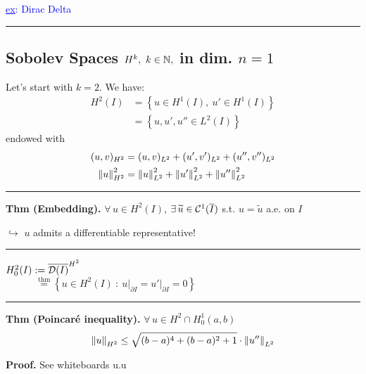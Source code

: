 \smallskip

\textcolor{blue}{\underline{ex}: Dirac Delta}

\rule{0.31\textwidth}{0.2pt}


\subsection{\texorpdfstring{\color{red}Sobolev Spaces \texorpdfstring{$H^k,\ k\in\mathbb{N},$}{C} in dim. \texorpdfstring{$n=1$}{C}}{}}


Let's start with $k=2$. We have:
\begin{align*}
H^2(I)&=\left\{ u\in H^1(I),\ u'\in H^1(I) \right\}\\&=\left\{ u,u',u''\in L^2(I) \right\}
\end{align*}
endowed with
\begin{align*}
(u,v)_{H^2}&=(u,v)_{L^2}+(u',v')_{L^2}+(u'',v'')_{L^2} \\
\left\lVert u \right\rVert^2_{H^2}&=\left\lVert u \right\rVert_{L^2}^2+\left\lVert u' \right\rVert_{L^2}^2+\left\lVert u'' \right\rVert_{L^2}^2
\end{align*}

\rule{0.31\textwidth}{0.2pt}
\smallskip

\textbf{Thm (Embedding).} $\forall\,u\in H^2(I)$, $\exists\,\widetilde{u}\in\mathcal{C}^1(\overline{I})$ s.t. $u=\widetilde{u}$ a.e. on $I$

\smallskip

$\hookrightarrow$ $u$ admits a differentiable representative!

\rule{0.31\textwidth}{0.2pt}

\newcolumn 

$
H^2_0(I):=\overline{\mathcal{D}(I)}^{H^2}
$ \\
$\qquad\quad\overset{\text{thm}}{=}\left\{ u\in H^2(I)\ :\ u\big|_{\partial I}=u'\big|_{\partial I}=0 \right\}
$

\rule{0.31\textwidth}{0.2pt}
\smallskip

\textbf{Thm (Poincaré inequality).} $\forall\, u\in H^2\cap H^1_0(a,b)$
\begin{equation*}
\left\lVert u \right\rVert_{H^2}\leq \sqrt{(b-a)^4+(b-a)^2+1}\cdot \left\lVert u'' \right\rVert_{L^2}
\end{equation*}

\textbf{\color{lavender(floral)}Proof.} See whiteboards u.u

\smallskip

